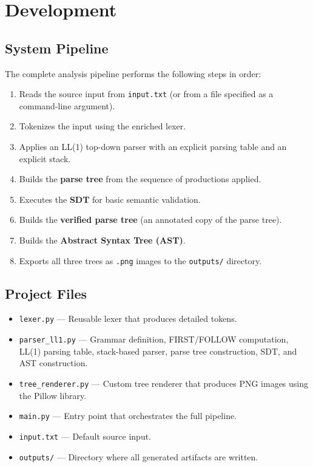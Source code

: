 \documentclass[letterpaper,12pt,oneside]{article}
\begin{document}
\section{Development}

\subsection{System Pipeline}

The complete analysis pipeline performs the following steps in order:

\begin{enumerate}
    \item Reads the source input from \texttt{input.txt} (or from a file specified
          as a command-line argument).
    \item Tokenizes the input using the enriched lexer.
    \item Applies an LL(1) top-down parser with an explicit parsing table and an
          explicit stack.
    \item Builds the \textbf{parse tree} from the sequence of productions applied.
    \item Executes the \textbf{SDT} for basic semantic validation.
    \item Builds the \textbf{verified parse tree} (an annotated copy of the parse tree).
    \item Builds the \textbf{Abstract Syntax Tree (AST)}.
    \item Exports all three trees as \texttt{.png} images to the \texttt{outputs/}
          directory.
\end{enumerate}

\subsection{Project Files}

\begin{itemize}
    \item \texttt{lexer.py} — Reusable lexer that produces detailed tokens.
    \item \texttt{parser\_ll1.py} — Grammar definition, FIRST/FOLLOW computation,
          LL(1) parsing table, stack-based parser, parse tree construction, SDT,
          and AST construction.
    \item \texttt{tree\_renderer.py} — Custom tree renderer that produces PNG images
          using the Pillow library.
    \item \texttt{main.py} — Entry point that orchestrates the full pipeline.
    \item \texttt{input.txt} — Default source input.
    \item \texttt{outputs/} — Directory where all generated artifacts are written.
\end{itemize}
\end{document}
